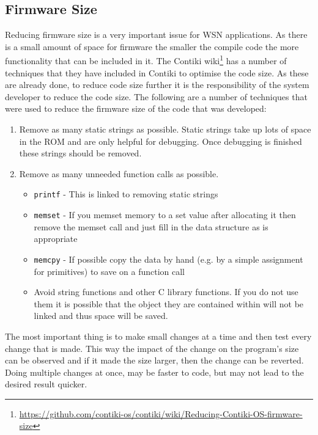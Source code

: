 \subsection{Firmware Size}

Reducing firmware size is a very important issue for WSN applications. As there is a small amount of space for firmware \cite{?} the smaller the compile code the more functionality that can be included in it. The Contiki wiki\footnote{\url{https://github.com/contiki-os/contiki/wiki/Reducing-Contiki-OS-firmware-size}} has a number of techniques that they have included in Contiki to optimise the code size. As these are already done, to reduce code size further it is the responsibility of the system developer to reduce the code size. The following are a number of techniques that were used to reduce the firmware size of the code that was developed:

\begin{enumerate}
\item Remove as many static strings as possible. Static strings take up lots of space in the ROM and are only helpful for debugging. Once debugging is finished these strings should be removed.
\item Remove as many unneeded function calls as possible.
\begin{itemize}
\item \verb|printf| - This is linked to removing static strings
\item \verb|memset| - If you memset memory to a set value after allocating it then remove the memset call and just fill in the data structure as is appropriate
\item \verb|memcpy| - If possible copy the data by hand (e.g. by a simple assignment for primitives) to save on a function call
\item Avoid string functions and other C library functions. If you do not use them it is possible that the object they are contained within will not be linked and thus space will be saved. \cite{?}
\end{itemize}
\end{enumerate}

The most important thing is to make small changes at a time and then test every change that is made. This way the impact of the change on the program's size can be observed and if it made the size larger, then the change can be reverted. Doing multiple changes at once, may be faster to code, but may not lead to the desired result quicker.

